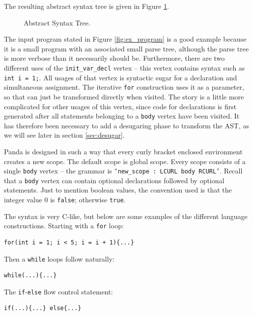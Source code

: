 The resulting abstract syntax tree is given in Figure \ref{fig:AST}.

\begin{figure}[H]
    \centering
    
    \caption{Abstract Syntax Tree.} 
    \label{fig:AST}
\end{figure}

The input program stated in Figure \ref{fig:ex_program} is a good example because it is a small program with an associated small parse tree, although the parse tree is more verbose than it necessarily should be. Furthermore, there are two different uses of the \texttt{init\_var\_decl} vertex -- this vertex contains syntax such as \texttt{int i = 1;}. All usages of that vertex is syntactic sugar for a declaration and simultaneous assignment. The iterative \texttt{for} construction uses it as a parameter, so that can just be transformed directly when visited. The story is a little more complicated for other usages of this vertex, since code for declarations is first generated after all statements belonging to a \texttt{body} vertex have been visited. It has therefore been necessary to add a desugaring phase to transform the AST, as we will see later in section \ref{sec:desugar}.

Panda is designed in such a way that every curly bracket enclosed environment creates a new scope. The default scope is global scope. Every scope consists of a single \texttt{body} vertex -- the grammar is \texttt{`new\_scope : LCURL body RCURL'}. Recall that a \texttt{body} vertex can contain optional declarations followed by optional statements. Just to mention boolean values, the convention used is that the integer value $0$ is \texttt{false}; otherwise \texttt{true}.

The syntax is very C-like, but below are some examples of the different language constructions. Starting with a \texttt{for} loop:

\begin{verbatim}
for(int i = 1; i < 5; i = i + 1){...}
\end{verbatim}

Then a \texttt{while} loops follow naturally:

\begin{verbatim}
while(...){...}
\end{verbatim}

The \texttt{if}-\texttt{else} flow control statement:

\begin{verbatim}
if(...){...} else{...}
\end{verbatim}

